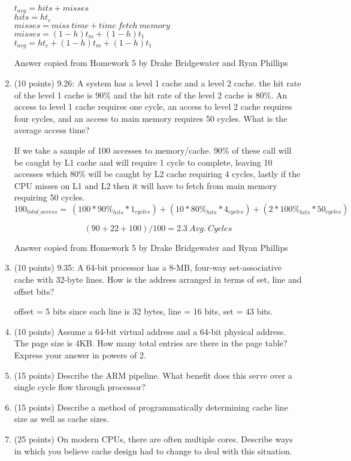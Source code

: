 \documentclass[letterpaper,10pt,onecolumn,titlepage]{article}
\begin{document}
\begin{enumerate}
\begin{mdframed}[style=MyFrame]
 $t_{avg}=hits+misses$\\
 $hits=ht_c$\\
 $misses=miss~time+time~fetch~memory$\\
 $misses=(1-h)t_m+(1-h)t_1$\\
 $t_{avg}=ht_c+(1-h)t_m+(1-h)t_1$
 
Answer copied from Homework 5 by Drake Bridgewater and Ryan Phillips \cite{HW5}
\end{mdframed}
\item (10 points) 9.26: A system has a level 1 cache and a level 2 cache. the hit rate of the level 1 cache is 90\% and the hit rate of the level 2 cache is 80\%. An access to level 1 cache requires one cycle, an access to level 2 cache requires four cycles, and an access to main memory requires 50 cycles. What is the average access time?
\begin{mdframed}[style=MyFrame]
If we take a sample of 100 accesses to memory/cache. 90\% of these call will be caught by L1 cache and will require 1 cycle to complete, leaving 10 accesses which 80\% will be caught by L2 cache requiring 4 cycles, lastly if the CPU misses on L1 and L2 then it will have to fetch from main memory requiring 50 cycles. 
\begin{equation*}
100_{total\_access} = ~(100*90\%_{hits}*1_{cycles})+(10*80\%_{hits}*4_{cycles})+(2*100\%_{hits}*50_{cycles})
\end{equation*}

\begin{equation*}
(90+22+100)/100=2.3 ~Avg.~Cycles
\end{equation*}

Answer copied from Homework 5 by Drake Bridgewater and Ryan Phillips \cite{HW5}
\end{mdframed}
\item (10 points) 9.35: A 64-bit processor has a 8-MB, four-way set-associative cache with 32-byte lines. How is the address arranged in terms of set, line and offset bits?

\begin{mdframed}[style=MyFrame]
offset = 5 bits since each line is 32 bytes, line = 16 bits, set = 43 bits.
\end{mdframed}%

\item (10 points) Assume a 64-bit virtual address and a 64-bit physical address. The page
  size is 4KB. How many total entries are there in the page table? Express your answer in
  powers of 2.

\item (15 points) Describe the ARM pipeline. What benefit does this serve over a single 
  cycle flow through processor?

\item (15 points) Describe a method of programmatically determining cache line size as 
  well as cache sizes.

\item (25 points) On modern CPUs, there are often multiple cores. Describe ways in which 
  you believe cache design had to change to deal with this situation.
\end{enumerate}

\newpage


\end{document}
